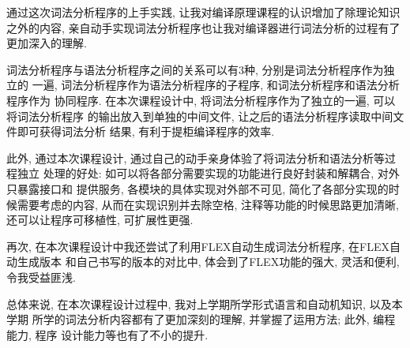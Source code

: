 通过这次词法分析程序的上手实践, 让我对编译原理课程的认识增加了除理论知识之外的内容, 
亲自动手实现词法分析程序也让我对编译器进行词法分析的过程有了更加深入的理解. 

词法分析程序与语法分析程序之间的关系可以有3种, 分别是词法分析程序作为独立的
一遍, 词法分析程序作为语法分析程序的子程序, 和词法分析程序和语法分析程序作为
协同程序. 在本次课程设计中, 将词法分析程序作为了独立的一遍, 可以将词法分析程序
的输出放入到单独的中间文件, 让之后的语法分析程序读取中间文件即可获得词法分析
结果, 有利于提柜编译程序的效率.

此外, 通过本次课程设计, 通过自己的动手亲身体验了将词法分析和语法分析等过程独立
处理的好处: 如可以将各部分需要实现的功能进行良好封装和解耦合, 对外只暴露接口和
提供服务, 各模块的具体实现对外部不可见, 简化了各部分实现的时候需要考虑的内容, 
从而在实现识别并去除空格, 注释等功能的时候思路更加清晰, 还可以让程序可移植性, 
可扩展性更强.

再次, 在本次课程设计中我还尝试了利用FLEX自动生成词法分析程序, 在FLEX自动生成版本
和自己书写的版本的对比中, 体会到了FLEX功能的强大, 灵活和便利, 令我受益匪浅.

总体来说, 在本次课程设计过程中, 我对上学期所学形式语言和自动机知识, 以及本学期
所学的词法分析内容都有了更加深刻的理解, 并掌握了运用方法; 此外, 编程能力, 程序
设计能力等也有了不小的提升.

